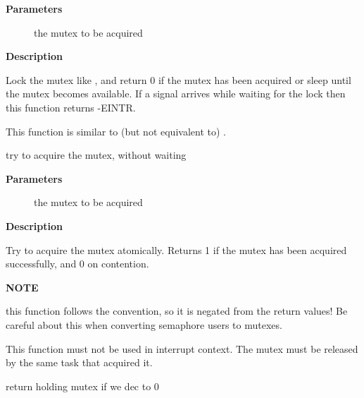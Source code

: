 \documentclass[a4paper,8pt,english]{sphinxmanual}
\begin{document}
\textbf{Parameters}
\begin{description}
\item[{}] \leavevmode
the mutex to be acquired

\end{description}

\textbf{Description}

Lock the mutex like {\hyperref[kernel\string-hacking/locking:c.mutex_lock]{\emph{}}}, and return 0 if the mutex has
been acquired or sleep until the mutex becomes available. If a
signal arrives while waiting for the lock then this function
returns -EINTR.

This function is similar to (but not equivalent to) .

\begin{fulllineitems}
\label{kernel-hacking/locking:c.mutex_trylock}
try to acquire the mutex, without waiting

\end{fulllineitems}


\textbf{Parameters}
\begin{description}
\item[{}] \leavevmode
the mutex to be acquired

\end{description}

\textbf{Description}

Try to acquire the mutex atomically. Returns 1 if the mutex
has been acquired successfully, and 0 on contention.

\textbf{NOTE}

this function follows the  convention, so
it is negated from the  return values! Be careful
about this when converting semaphore users to mutexes.

This function must not be used in interrupt context. The
mutex must be released by the same task that acquired it.

\begin{fulllineitems}
\label{kernel-hacking/locking:c.atomic_dec_and_mutex_lock}
return holding mutex if we dec to 0

\end{fulllineitems}
\end{document}
